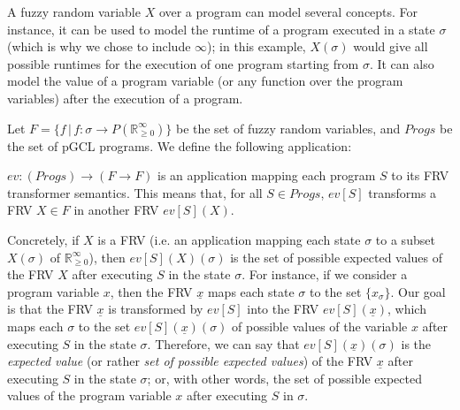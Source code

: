 \documentclass[a4paper,10pt]{llncs}
\def\RRposi {{\mathbb R_{\geq 0}^{\infty}}}
\begin{document}
A fuzzy random variable $X$ over a program can model several concepts. For instance, it can be used to model the runtime of a program executed in a state $\sigma$ (which is why we chose to include $\infty$); in this example, $X(\sigma)$ would give all possible runtimes for the execution of one program starting from $\sigma$. It can also model the value of a program variable (or any function over the program variables) after the execution of a program.\newline

Let $F = \{f \,|\, f : \sigma \rightarrow P(\RRposi) \}$ be the set of fuzzy random variables, and $Progs$ be the set of pGCL programs. We define the following application:

\begin{definition}
 $ev : (Progs) \rightarrow (F \rightarrow F)$ is an application mapping each program $S$ to its FRV transformer semantics. This means that, for all $S \in Progs$, $ev[S]$ transforms a FRV $X \in F$ in another FRV $ev[S](X)$.
\end{definition}
Concretely, if $X$ is a FRV (i.e. an application mapping each state $\sigma$ to a subset $X(\sigma)$ of $\RRposi$), then $ev[S](X)(\sigma)$ is the set of possible expected values of the FRV $X$ after executing $S$ in the state $\sigma$.\newline
For instance, if we consider a program variable $x$, then the FRV $\underline{x}$ maps each state $\sigma$ to the set $\{x_\sigma\}$. Our goal is that the FRV $\underline{x}$ is transformed by $ev[S]$ into the FRV $ev[S](\underline{x})$, which maps each $\sigma$ to the set $ev[S](\underline{x})(\sigma)$ of possible values of the variable $x$ after executing $S$ in the state $\sigma$. Therefore, we can say that $ev[S](\underline{x})(\sigma)$ is the \emph{expected value} (or rather \emph{set of possible expected values}) of the FRV $\underline{x}$ after executing $S$ in the state $\sigma$; or, with other words, the set of possible expected values of the program variable $x$ after executing $S$ in $\sigma$.\newline
\end{document}
